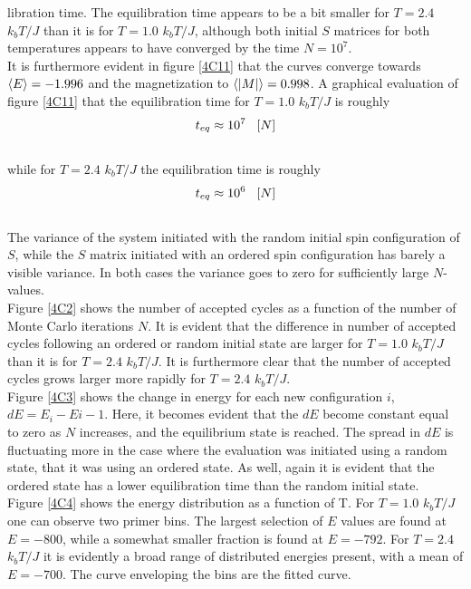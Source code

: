 \documentclass[%
reprint,nofootinbib,
amsmath,amssymb,
aps,
]{revtex4-1}
\begin{document}
\noindent libration time. The equilibration time appears to be a bit smaller for $T = 2.4$ $k_bT/J$ than it is for $T = 1.0$ $k_bT/J$, although both initial $S$ matrices for both temperatures appears to have converged by the time $N = 10^7$. \\ \indent 
It is furthermore evident in figure \ref{4C11} that the curves converge towards $\expval{E} = -1.996$ and the magnetization to $\expval{\abs{M}} = 0.998$. A graphical evaluation of figure \ref{4C11} that the equilibration time for $T = 1.0$ $k_bT/J$ is roughly \\
\begin{equation*}
	t_{eq} \approx 10^7 \hspace{3mm}[N]
\end{equation*}\\
 while for $T = 2.4$ $k_bT/J$ the equilibration time is roughly \\  
 \begin{equation*}
 t_{eq} \approx 10^6 \hspace{3mm}[N]
 \end{equation*} \\ 
The variance of the system initiated with the random initial spin configuration of $S$, while the $S$ matrix initiated with an ordered spin configuration has barely a visible variance. In both cases the variance goes to zero for sufficiently large $N$-values. \\ 
Figure \ref{4C2} shows the number of accepted cycles as a function of the number of Monte Carlo iterations $N$. It is evident that the difference in number of accepted cycles following an ordered or random initial state are larger for $T = 1.0$ $k_bT/J$ than it is for $T = 2.4$ $k_bT/J$. It is furthermore clear that the number of accepted cycles grows larger more rapidly for $T = 2.4$ $k_bT/J$. \\ \indent  
Figure \ref{4C3} shows the change in energy for each new configuration $i$, $dE = E_i-E{i-1}$. Here, it becomes evident that the $dE$ become constant equal to zero as $N$ increases, and the equilibrium state is reached. The spread in $dE$ is fluctuating more in the case where the evaluation was initiated using a random state, that it was using an ordered state. As well, again it is evident that the ordered state has a lower equilibration time than the random initial state. \\ \indent 
Figure \ref{4C4} shows the energy distribution as a function of T. For $T = 1.0$ $k_bT/J$ one can observe two primer bins. The largest selection of $E$ values are found at $E = -800$, while a somewhat smaller fraction is found at $E = - 792$. For $T = 2.4$ $k_bT/J$ it is evidently a broad range of distributed energies present, with a mean of $E = -700$. The curve enveloping the bins are the fitted curve. 
\end{document}
